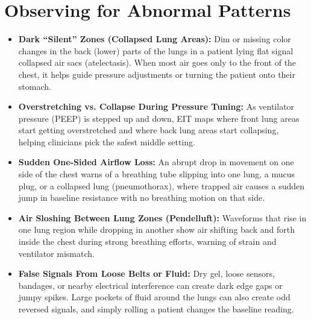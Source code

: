 \section{Observing for Abnormal Patterns}
\begin{itemize}
    \item \textbf{Dark ``Silent'' Zones (Collapsed Lung Areas):} Dim or missing color changes in the back (lower) parts of the lungs in a patient lying flat signal collapsed air sacs (atelectasis). When most air goes only to the front of the chest, it helps guide pressure adjustments or turning the patient onto their stomach.
    \item \textbf{Overstretching vs. Collapse During Pressure Tuning:} As ventilator pressure (PEEP) is stepped up and down, EIT maps where front lung areas start getting overstretched and where back lung areas start collapsing, helping clinicians pick the safest middle setting.
    \item \textbf{Sudden One-Sided Airflow Loss:} An abrupt drop in movement on one side of the chest warns of a breathing tube slipping into one lung, a mucus plug, or a collapsed lung (pneumothorax), where trapped air causes a sudden jump in baseline resistance with no breathing motion on that side.
    \item \textbf{Air Sloshing Between Lung Zones (Pendelluft):} Waveforms that rise in one lung region while dropping in another show air shifting back and forth inside the chest during strong breathing efforts, warning of strain and ventilator mismatch.
    \item \textbf{False Signals From Loose Belts or Fluid:} Dry gel, loose sensors, bandages, or nearby electrical interference can create dark edge gaps or jumpy spikes. Large pockets of fluid around the lungs can also create odd reversed signals, and simply rolling a patient changes the baseline reading.
\end{itemize}


